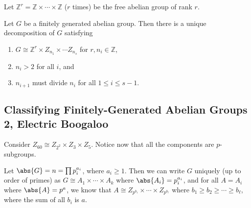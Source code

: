 \begin{definition}
Let $\mathbb{Z}^r = \mathbb{Z} \times \cdots \times \mathbb{Z}$ ($r$ times) be the free abelian group of rank $r$.
\end{definition}

\begin{theorem}
Let $G$ be a finitely generated abelian group. Then there is a unique decomposition of $G$ satisfying
\begin{enumerate}
\item $G \cong \mathbb{Z}^r \times Z_{n_1} \times \cdots Z_{n_s}$ for $r,n_i \in \mathbb{Z}$,
\item $n_i > 2$ for all $i$, and 
\item $n_{i+1}$ must divide $n_i$ for all $1 \leq i \leq s-1$.
\end{enumerate}
\end{theorem}

\subsection{Classifying Finitely-Generated Abelian Groups 2, Electric Boogaloo}

\begin{example}
Consider $Z_{60} \cong Z_{2^2} \times Z_{3} \times Z_{5}$. Notice now that all the components are $p$-subgroups.
\end{example}

\begin{theorem}
Let $\abs{G} = n = \prod p_i^{a_i}$, where $a_i \geq 1$. Then we can write $G$ uniquely (up to order of primes) as $G \cong A_1 \times \cdots \times A_k$ where $\abs{A_i} = p_i^{a_i}$, and for all $A = A_i$ where $\abs{A} = p^a$, we know that $A \cong Z_{p^{b_1}} \times \cdots \times Z_{p^{b_\ell}}$ where $b_1 \geq b_2 \geq \cdots \geq b_\ell$, where the sum of all $b_i$ is $a$.
\end{theorem}
